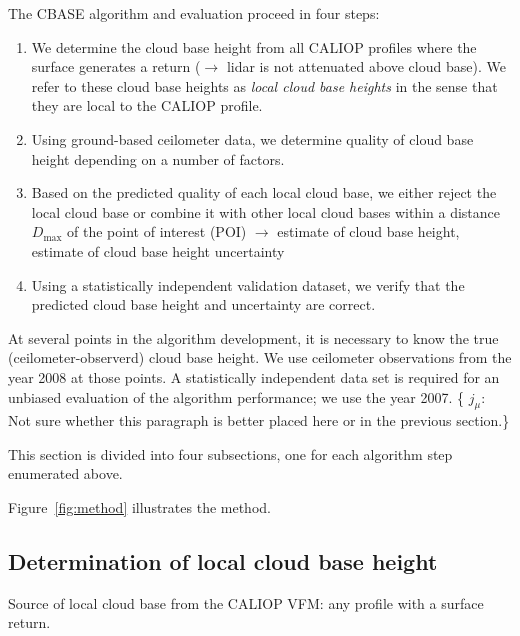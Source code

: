 \documentclass[amt,manuscript]{copernicus}\usepackage[]{graphicx}\usepackage[]{color}
\newcommand{\hlnum}[1]{\textcolor[rgb]{0.686,0.059,0.569}{#1}}%
\newcommand\comment[2]{\{\hlnum{ \textit{#1}: #2}\}}
\newcommand\commentjm[1]{\comment{$j_\mu$}{#1}}
\begin{document}
The CBASE algorithm and evaluation proceed in four steps:
\begin{enumerate}
\item We determine the cloud base height from all CALIOP profiles where the
  surface generates a return ($\longrightarrow$ lidar is not attenuated above
  cloud base).  We refer to these cloud base heights as \textit{local cloud base
    heights} in the sense that they are local to the CALIOP profile.
\item Using ground-based ceilometer data, we determine quality of cloud base
  height depending on a number of factors.  
\item Based on the predicted quality of each local cloud base, we either reject
  the local cloud base or combine it with other local cloud bases within a
  distance $D_\text{max}$ of the point of interest (POI) $\longrightarrow$
  estimate of cloud base height, estimate of cloud base height uncertainty
\item Using a statistically independent validation dataset, we verify that the
  predicted cloud base height and uncertainty are correct.
\end{enumerate}

At several points in the algorithm development, it is necessary to know the true
(ceilometer-observerd) cloud base height.  We use ceilometer observations from
the year 2008 at those points.  A statistically independent data set is required
for an unbiased evaluation of the algorithm performance; we use the year
2007. \commentjm{Not sure whether this paragraph is better placed here or in the
previous section.}

This section is divided into four subsections, one for each algorithm step
enumerated above.

Figure~\ref{fig:method} illustrates the method.

\subsection{Determination of local cloud base height}
\label{sec:algorithm:local}
Source of local cloud base from the CALIOP VFM: any profile with a surface
return.  
\end{document}
